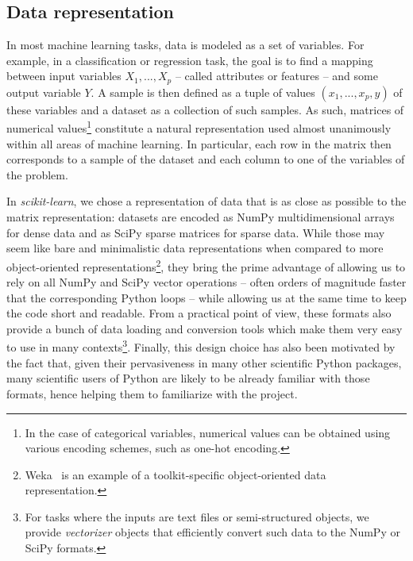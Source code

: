 \documentclass{llncs}
\begin{document}
\subsection{Data representation}

In most machine learning tasks, data is modeled as a set of variables.  For
example, in a classification or regression task, the goal is to find a mapping
between input variables $X_1, ..., X_p$ -- called attributes or features -- and
some output variable $Y$. A sample is then defined as a tuple of values $(x_1,
..., x_p, y)$ of these variables and a dataset as a collection of such samples.
As such, matrices of numerical values\footnote{In the case of categorical
variables, numerical values can be obtained using various encoding schemes, such
as one-hot encoding.} constitute a natural representation used almost
unanimously within all areas of machine learning. In particular, each row in the
matrix then corresponds to a sample of the dataset and each column to one of the
variables of the problem.

In \textit{scikit-learn}, we chose a representation of data that is as close as
possible to the matrix representation: datasets are encoded as NumPy
multidimensional arrays for dense data and as SciPy sparse matrices for sparse
data. While those may seem like bare and minimalistic data representations
when compared to more object-oriented
representations\footnote{Weka~\citep{hall2009weka} is an example of a toolkit-specific
object-oriented data representation.}, they bring the prime advantage
of allowing us to rely on all NumPy and SciPy vector operations -- often orders
of magnitude faster that the corresponding Python loops -- while allowing us at
the same time to keep the code short and readable. From a practical point of
view, these formats also provide a bunch of data loading and conversion tools
which make them very easy to use in many contexts\footnote{For tasks where the
inputs are text files or semi-structured objects, we provide \textit{vectorizer}
objects that efficiently convert such data to the NumPy or SciPy formats.}.
Finally, this design choice has also been motivated by the fact that, given
their pervasiveness in many other scientific Python packages, many scientific
users of Python are likely to be already familiar with those formats, hence helping
them to familiarize with the project.
\end{document}
